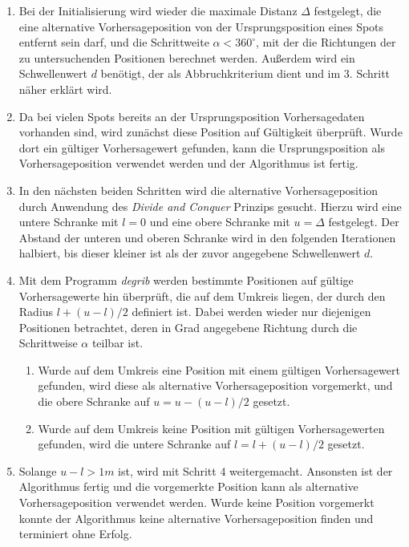 \begin{enumerate}

\item Bei der Initialisierung wird wieder die maximale Distanz
  $\Delta$ festgelegt, die eine alternative Vorhersageposition von der
  Ursprungsposition eines Spots entfernt sein darf, und die
  Schrittweite $\alpha < 360^{\circ}$, mit der die Richtungen der zu
  untersuchenden Positionen berechnet werden. Außerdem wird ein
  Schwellenwert $d$ benötigt, der als Abbruchkriterium dient und im
  3. Schritt näher erklärt wird.

\item Da bei vielen Spots bereits an der Ursprungsposition
  Vorhersagedaten vorhanden sind, wird zunächst diese Position auf
  Gültigkeit überprüft. Wurde dort ein gültiger Vorhersagewert
  gefunden, kann die Ursprungsposition als Vorhersageposition
  verwendet werden und der Algorithmus ist fertig.

\item In den nächsten beiden Schritten wird die alternative
  Vorhersageposition durch Anwendung des \textit{Divide and Conquer}
  Prinzips gesucht. Hierzu wird eine untere Schranke mit $l = 0$ und
  eine obere Schranke mit $u = \Delta$ festgelegt. Der Abstand der
  unteren und oberen Schranke wird in den folgenden Iterationen
  halbiert, bis dieser kleiner ist als der zuvor angegebene
  Schwellenwert $d$. 

\item Mit dem Programm \textit{degrib} werden bestimmte Positionen auf
  gültige Vorhersagewerte hin überprüft, die auf dem Umkreis liegen,
  der durch den Radius $l + (u - l)/2$ definiert ist. Dabei werden
  wieder nur diejenigen Positionen betrachtet, deren in Grad
  angegebene Richtung durch die Schrittweise $\alpha$ teilbar ist.

  \begin{enumerate}

  \item Wurde auf dem Umkreis eine Position mit einem gültigen
    Vorhersagewert gefunden, wird diese als alternative
    Vorhersageposition vorgemerkt, und die obere Schranke auf $u = u -
    (u - l)/2$ gesetzt.

  \item Wurde auf dem Umkreis keine Position mit gültigen
    Vorhersagewerten gefunden, wird die untere Schranke auf $l = l + (u -
    l)/2$ gesetzt.

  \end{enumerate}

\item Solange $u - l > 1m$ ist, wird mit Schritt 4
  weitergemacht. Ansonsten ist der Algorithmus fertig und die
  vorgemerkte Position kann als alternative Vorhersageposition
  verwendet werden. Wurde keine Position vorgemerkt konnte der
  Algorithmus keine alternative Vorhersageposition finden und
  terminiert ohne Erfolg.

\end{enumerate}

